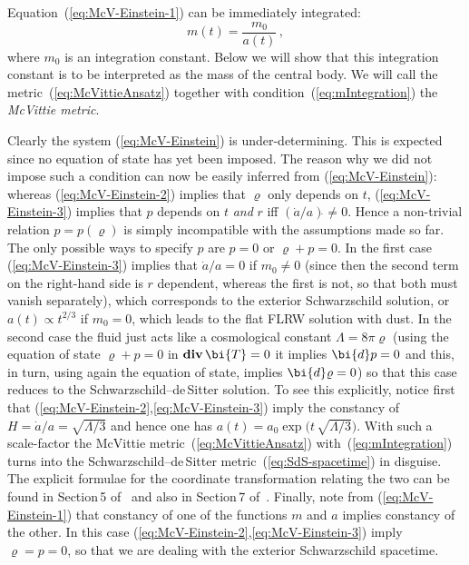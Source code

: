 \documentclass
[rmp,aps,twocolumn,showpacs,preprintnumbers,amsmath,amssymb]{revtex4}
\theoremstyle{plain}
\theoremstyle{definition}
\theoremstyle{remark}
\newcommand{\br}[1]{\mathbf{#1}}              %
\DeclareMathOperator{\Div}{\br{div}}          %
\newcommand{\ed}{\bi{d}}                      %
\newcommand{\bT}{\bi{T}}
\begin{document}
Equation~(\ref{eq:McV-Einstein-1}) can be immediately integrated:
%
\begin{equation}\label{eq:mIntegration}
  m(t) = \frac{m_0}{a(t)} \,,
\end{equation}
%
where $m_0$ is an integration constant. Below we will show that this 
integration constant is to be interpreted as the mass of the central
body. We will call the metric~(\ref{eq:McVittieAnsatz}) together
with condition~(\ref{eq:mIntegration}) the \emph{McVittie metric}. 

Clearly the system (\ref{eq:McV-Einstein}) is under-determining. 
This is expected since no equation of state has yet been imposed. 
The reason why we did not impose such a condition can now be easily 
inferred from (\ref{eq:McV-Einstein}): whereas  (\ref{eq:McV-Einstein-2}) 
implies that $\varrho$ only depends on $t$, (\ref{eq:McV-Einstein-3}) 
implies that $p$ depends on $t$ \emph{and} $r$ iff $(\dot a/a)\dot{}\ne 0$. 
Hence a non-trivial relation $p=p(\varrho)$ is simply incompatible with the 
assumptions made so far. 
The only possible ways to specify $p$ are $p=0$ or $\varrho+p=0$. 
In the first case (\ref{eq:McV-Einstein-3}) implies that $\dot a/a=0$
if $m_0\ne 0$ (since then the second term on the right-hand side is
$r$ dependent, whereas the first is not, so that both must vanish
separately), which corresponds to the exterior Schwarzschild 
solution, or $a(t)\propto t^{2/3}$ if $m_0=0$, which leads to the 
flat FLRW solution with dust. In the second case the fluid just acts 
like a cosmological constant $\Lambda=8\pi\varrho$ (using the equation 
of state $\varrho+p=0$ in $\Div\bT=0$ it implies $\ed p=0$ and this, 
in turn, using again the equation of state, implies $\ed \varrho=0$) so 
that this case reduces to the Schwarzschild--de\,Sitter solution. 
To see this explicitly, notice first that 
(\ref{eq:McV-Einstein-2},\ref{eq:McV-Einstein-3}) imply the constancy 
of $H=\dot a/a=\sqrt{\Lambda/3}$ and hence one has 
$a(t)=a_0\exp\bigl(t\,\sqrt{\Lambda/3}\bigr)$. With such a scale-factor 
the McVittie metric~(\ref{eq:McVittieAnsatz}) with~(\ref{eq:mIntegration}) 
turns into the Schwarzschild--de\,Sitter metric~(\ref{eq:SdS-spacetime}) 
in disguise. 
The explicit formulae for the coordinate transformation relating 
the two can be found in Section\,5 of~\cite{Robertson:1928} and also in 
Section\,7 of~\cite{Klioner.Soffel:2005}. Finally, note from 
(\ref{eq:McV-Einstein-1}) that constancy of one of the functions $m$ and 
$a$ implies constancy of the other. In this case 
(\ref{eq:McV-Einstein-2},\ref{eq:McV-Einstein-3}) imply $\varrho=p=0$, so 
that we are dealing with the exterior Schwarzschild spacetime. 
\end{document}
